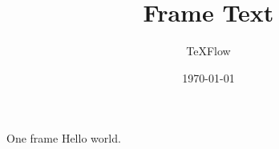 \documentclass[aspectratio=43]{beamer}
\title{Frame Text}
\author{TeXFlow}
\date{\today}
\begin{document}
\begin{frame}{One frame}
Hello world.
\end{frame}
\end{document}
